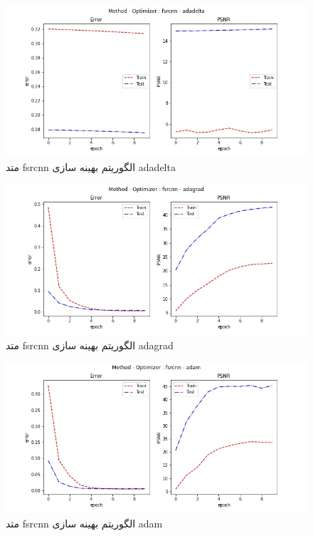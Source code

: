  \begin{figure}[!h] 
       \centering 
       \includegraphics[width=160mm]{./chapter3/images/error-psnr-fsrcnn-adadelta.jpg}
       \caption{متد fsrcnn الگوریتم بهینه سازی adadelta}
       \label{fig:error-psnr-fsrcnn-adadelta}
 \end{figure}
 \begin{figure}[!h] 
       \centering 
       \includegraphics[width=160mm]{./chapter3/images/error-psnr-fsrcnn-adagrad.jpg}
       \caption{متد fsrcnn الگوریتم بهینه سازی adagrad}
       \label{fig:error-psnr-fsrcnn-adagrad}
 \end{figure}
 \begin{figure}[!h] 
       \centering 
       \includegraphics[width=160mm]{./chapter3/images/error-psnr-fsrcnn-adam.jpg}
       \caption{متد fsrcnn الگوریتم بهینه سازی adam}
       \label{fig:error-psnr-fsrcnn-adam}
 \end{figure}
